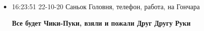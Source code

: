  

\begin{itemize}
\item 16:23:51 22-10-20 Саньок Головня, телефон, работа, на Гончара

\textbf{Все будет Чики-Пуки, взяли и пожали Друг Другу Руки}

\end{itemize}
 
